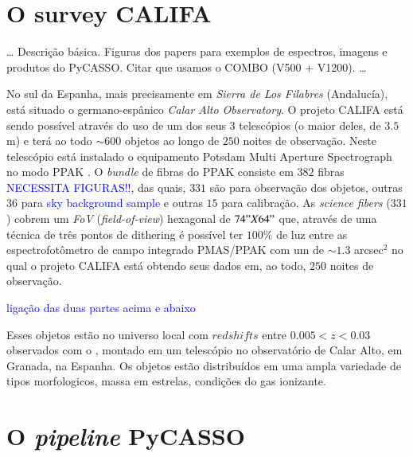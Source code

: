 \section{O survey CALIFA}
\label{sec:CALePyC:Apresent}

\ldots
Descrição básica. Figuras dos papers para exemplos de espectros, imagens e 
produtos do PyCASSO. Citar que usamos o COMBO (V500 + V1200).
\ldots

No sul da Espanha, mais precisamente em {\em Sierra de Los Filabres}
(Andalucía), está situado o germano-espânico {\em Calar Alto Observatory}. O
projeto CALIFA está sendo possível através do uso de um dos seus $3$ telescópios
(o maior deles, de $3.5$m) e terá ao todo $\sim 600$ objetos ao longo de $250$
noites de observação. Neste telescópio está instalado o equipamento Potsdam
Multi Aperture Spectrograph \citep[PMAS; ][]{Roth2005} no modo PPAK
\citep{Verheijen2004, Kelz2006}. O {\em bundle} de fibras do PPAK consiste em
$382$ fibras \fixme \textcolor{blue}{NECESSITA FIGURAS!!}, das quais, $331$ são
para observação dos objetos, outras $36$ para \fixme \textcolor{blue}{sky
background sample} e outras $15$ para calibração. As {\em science fibers}
($331$) cobrem um {\em FoV} ({\em field-of-view}) hexagonal de $74" X 64"$ que,
através de uma técnica de três pontos de dithering \fixme \citneed é possível
ter $100\%$ de luz entre as espectrofotômetro de campo integrado PMAS/PPAK com
um  de $\sim1.3$ arcsec$^2$ no qual o projeto CALIFA está obtendo seus dados
em, ao todo, $250$ noites de observação.

\fixme \textcolor{blue}{ligação das duas partes acima e abaixo}
 
Esses objetos estão no universo local com $redshifts$ entre $0.005 < z < 0.03$
observados com o , montado em um telescópio no
observatório de Calar Alto, em Granada, na Espanha. Os objetos estão
distribuídos em uma ampla variedade de tipos morfologicos, massa em estrelas,
condições do gas ionizante.


\section{O {\em pipeline} PyCASSO}
\label{sec:CALePyC:PyCASSO}

